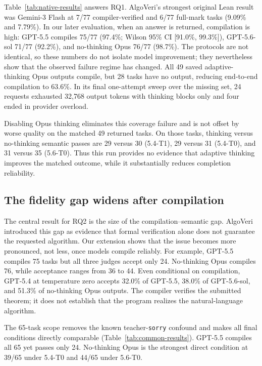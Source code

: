 \documentclass{article}
\newcommand{\pct}[1]{#1\%}
\begin{document}
Table~\ref{tab:native-results} answers RQ1.  AlgoVeri's strongest original Lean result
was Gemini-3 Flash at 7/77 compiler-verified and 6/77 full-mark tasks
(9.09\% and 7.79\%)\cite{zhao2026algoveri}.  In our later evaluation, when an answer is
returned, compilation is high: GPT-5.5 compiles 75/77
(\pct{97.4}; Wilson 95\% CI [\pct{91.0}, \pct{99.3}]), GPT-5.6-sol 71/77
(\pct{92.2}), and no-thinking Opus 76/77 (\pct{98.7}).  The protocols are not identical,
so these numbers do not isolate model improvement; they nevertheless show that the
observed failure regime has changed.  All 49 saved adaptive-thinking
Opus outputs compile, but 28 tasks have no output, reducing end-to-end compilation to
\pct{63.6}.  In its final one-attempt sweep over the missing set, 24 requests exhausted
32,768 output tokens with thinking blocks only and four ended in provider overload.

Disabling Opus thinking eliminates this coverage failure and is not offset by worse
quality on the matched 49 returned tasks.  On those tasks, thinking versus no-thinking
semantic passes are 29 versus 30 (5.4-T1), 29 versus 31 (5.4-T0), and 31 versus 35
(5.6-T0).  Thus this run provides no evidence that adaptive thinking improves the
matched outcome, while it substantially reduces completion reliability.

\subsection{The fidelity gap widens after compilation}

The central result for RQ2 is the size of the compilation--semantic gap.  AlgoVeri
introduced this gap as evidence that formal verification alone does not guarantee the
requested algorithm.  Our extension shows that the issue becomes more pronounced, not
less, once models compile reliably.  For example,
GPT-5.5 compiles 75 tasks but all three judges accept only 24.  No-thinking Opus compiles
76, while acceptance ranges from 36 to 44.  Even conditional on compilation, GPT-5.4 at
temperature zero accepts 32.0\% of GPT-5.5, 38.0\% of GPT-5.6-sol, and 51.3\% of
no-thinking Opus outputs.  The compiler verifies the submitted theorem; it does not
establish that the program realizes the natural-language algorithm.

The 65-task scope removes the known teacher-\texttt{sorry} confound and makes all final
conditions directly comparable (Table~\ref{tab:common-results}).  GPT-5.5 compiles all
65 yet passes only 24.  No-thinking Opus is the strongest direct condition at 39/65
under 5.4-T0 and 44/65 under 5.6-T0.
\end{document}
